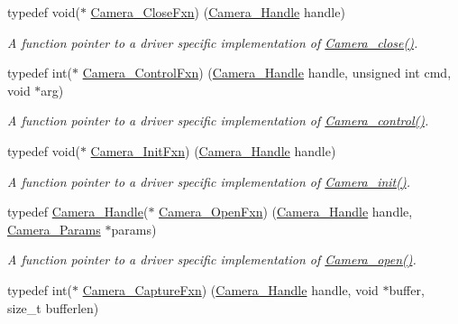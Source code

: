 \begin{DoxyCompactItemize}
typedef void($\ast$ \hyperlink{_camera_8h_ae6f2789af3ea253197fd2ce98db352f4}{Camera\+\_\+\+Close\+Fxn}) (\hyperlink{_camera_8h_a68ce39c29bb7acaf6a7180bb6d6a7d06}{Camera\+\_\+\+Handle} handle)
\begin{DoxyCompactList}\small\item\em A function pointer to a driver specific implementation of \hyperlink{_camera_8h_a132c638e5ea994c1f06124f5762470b4}{Camera\+\_\+close()}. \end{DoxyCompactList}\item 
typedef int($\ast$ \hyperlink{_camera_8h_ae81dd59b680fa8d7a3a9f8fc226f593f}{Camera\+\_\+\+Control\+Fxn}) (\hyperlink{_camera_8h_a68ce39c29bb7acaf6a7180bb6d6a7d06}{Camera\+\_\+\+Handle} handle, unsigned int cmd, void $\ast$arg)
\begin{DoxyCompactList}\small\item\em A function pointer to a driver specific implementation of \hyperlink{_camera_8h_adfc7e9a60daa499220296a238a09b393}{Camera\+\_\+control()}. \end{DoxyCompactList}\item 
typedef void($\ast$ \hyperlink{_camera_8h_a3b6d043e96bfc1f1443521ef10ea01f3}{Camera\+\_\+\+Init\+Fxn}) (\hyperlink{_camera_8h_a68ce39c29bb7acaf6a7180bb6d6a7d06}{Camera\+\_\+\+Handle} handle)
\begin{DoxyCompactList}\small\item\em A function pointer to a driver specific implementation of \hyperlink{_camera_8h_ab0208c74b70ac5b50cb26c36f1f3ebad}{Camera\+\_\+init()}. \end{DoxyCompactList}\item 
typedef \hyperlink{_camera_8h_a68ce39c29bb7acaf6a7180bb6d6a7d06}{Camera\+\_\+\+Handle}($\ast$ \hyperlink{_camera_8h_a589bec3690a5b7c7890a0e411a1cad9f}{Camera\+\_\+\+Open\+Fxn}) (\hyperlink{_camera_8h_a68ce39c29bb7acaf6a7180bb6d6a7d06}{Camera\+\_\+\+Handle} handle, \hyperlink{struct_camera___params}{Camera\+\_\+\+Params} $\ast$params)
\begin{DoxyCompactList}\small\item\em A function pointer to a driver specific implementation of \hyperlink{_camera_8h_a5bd1f515c97e0f598ff554c663bc6cde}{Camera\+\_\+open()}. \end{DoxyCompactList}\item 
typedef int($\ast$ \hyperlink{_camera_8h_a2096274266d6a07b48ee25d8f43805a0}{Camera\+\_\+\+Capture\+Fxn}) (\hyperlink{_camera_8h_a68ce39c29bb7acaf6a7180bb6d6a7d06}{Camera\+\_\+\+Handle} handle, void $\ast$buffer, size\+\_\+t bufferlen)

\end{DoxyCompactItemize}
